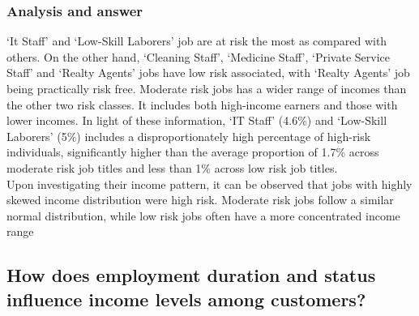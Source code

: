\documentclass{article}\usepackage[]{graphicx}\usepackage[]{xcolor}
\begin{document}
\subsubsection{Analysis and answer}

`It Staff' and `Low-Skill Laborers' job are at risk the most as compared with others. On the other hand, `Cleaning Staff', `Medicine Staff', `Private Service Staff' and `Realty Agents' jobs have low risk associated, with `Realty Agents' job being practically risk free. Moderate risk jobs has a wider range of incomes than the other two risk classes. It includes both high-income earners and those with lower incomes. In light of these information, `IT Staff' (4.6\%) and `Low-Skill Laborers' (5\%) includes a disproportionately high percentage of high-risk individuals, significantly higher than the average proportion of 1.7\% across moderate risk job titles and less than 1\% across low risk job titles.\\

Upon investigating their income pattern, it can be observed that jobs with highly skewed income distribution were high risk. Moderate risk jobs follow a similar normal distribution, while low risk jobs often have a more concentrated income range


\subsection{How does employment duration and status influence income levels among customers?}
\end{document}
